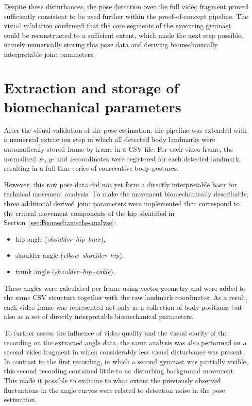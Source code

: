 Despite these disturbances, the pose detection over the full video fragment proved sufficiently consistent to be used further within the proof-of-concept pipeline. The visual validation confirmed that the core segments of the executing gymnast could be reconstructed to a sufficient extent, which made the next step possible, namely numerically storing this pose data and deriving biomechanically interpretable joint parameters.

\section{Extraction and storage of biomechanical parameters}

After the visual validation of the pose estimation, the pipeline was extended with a numerical extraction step in which all detected body landmarks were automatically stored frame by frame in a CSV file. For each video frame, the normalised $x$-, $y$- and $z$-coordinates were registered for each detected landmark, resulting in a full time series of consecutive body postures.

However, this raw pose data did not yet form a directly interpretable basis for technical movement analysis. To make the movement biomechanically describable, three additional derived joint parameters were implemented that correspond to the critical movement components of the kip identified in Section~\ref{sec:Biomechanische-analyse}:

\begin{itemize}
    \item hip angle (\textit{shoulder--hip--knee}),
    \item shoulder angle (\textit{elbow--shoulder--hip}),
    \item trunk angle (\textit{shoulder--hip--ankle}).
\end{itemize}

These angles were calculated per frame using vector geometry and were added to the same CSV structure together with the raw landmark coordinates. As a result, each video frame was represented not only as a collection of body positions, but also as a set of directly interpretable biomechanical parameters.

To further assess the influence of video quality and the visual clarity of the recording on the extracted angle data, the same analysis was also performed on a second video fragment in which considerably less visual disturbance was present. In contrast to the first recording, in which a second gymnast was partially visible, this second recording contained little to no disturbing background movement. This made it possible to examine to what extent the previously observed fluctuations in the angle curves were related to detection noise in the pose estimation.

